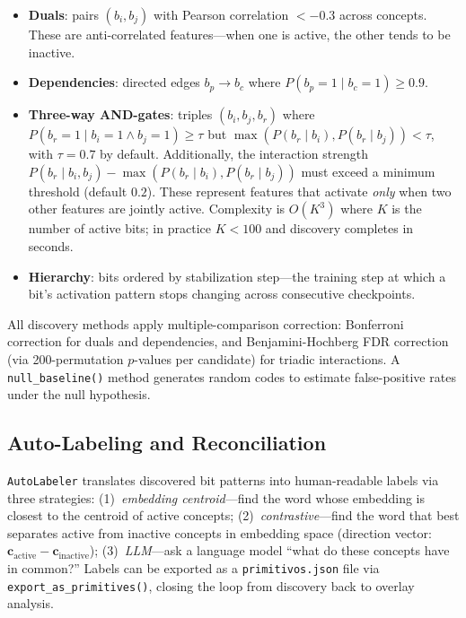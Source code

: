 \documentclass[11pt]{article}
\begin{document}
\begin{itemize}[nosep]
    \item \textbf{Duals}: pairs $(b_i, b_j)$ with Pearson correlation $< -0.3$ across concepts. These are anti-correlated features---when one is active, the other tends to be inactive.
    \item \textbf{Dependencies}: directed edges $b_p \to b_c$ where $P(b_p = 1 \mid b_c = 1) \geq 0.9$.
    \item \textbf{Three-way AND-gates}: triples $(b_i, b_j, b_r)$ where $P(b_r = 1 \mid b_i = 1 \wedge b_j = 1) \geq \tau$ but $\max(P(b_r \mid b_i), P(b_r \mid b_j)) < \tau$, with $\tau = 0.7$ by default. Additionally, the interaction strength $P(b_r \mid b_i, b_j) - \max(P(b_r \mid b_i), P(b_r \mid b_j))$ must exceed a minimum threshold (default $0.2$). These represent features that activate \emph{only} when two other features are jointly active. Complexity is $O(K^3)$ where $K$ is the number of active bits; in practice $K < 100$ and discovery completes in seconds.
    \item \textbf{Hierarchy}: bits ordered by stabilization step---the training step at which a bit's activation pattern stops changing across consecutive checkpoints.
\end{itemize}

All discovery methods apply multiple-comparison correction: Bonferroni correction for duals and dependencies, and Benjamini-Hochberg FDR correction (via 200-permutation $p$-values per candidate) for triadic interactions. A \texttt{null\_baseline()} method generates random codes to estimate false-positive rates under the null hypothesis.

\subsection{Auto-Labeling and Reconciliation}

\texttt{AutoLabeler} translates discovered bit patterns into human-readable labels via three strategies: (1)~\emph{embedding centroid}---find the word whose embedding is closest to the centroid of active concepts; (2)~\emph{contrastive}---find the word that best separates active from inactive concepts in embedding space (direction vector: $\mathbf{c}_{\text{active}} - \mathbf{c}_{\text{inactive}}$); (3)~\emph{LLM}---ask a language model ``what do these concepts have in common?'' Labels can be exported as a \texttt{primitivos.json} file via \texttt{export\_as\_primitives()}, closing the loop from discovery back to overlay analysis.
\end{document}
